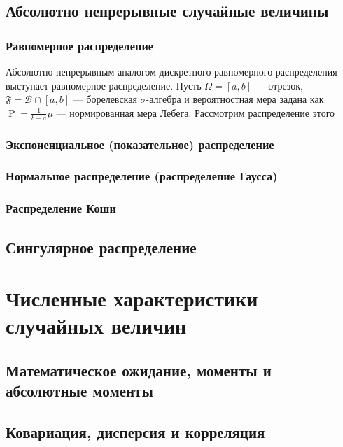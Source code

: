 \documentclass[12pt]{article}
\numberwithin{theorem}{section}
\theoremstyle{definition}
\newcommand{\calB}{\mathcal{B}}
\newcommand{\prob}{\operatorname{P}}
\newcommand{\events}{\mathfrak{F}}
\begin{document}
	\subsection{Абсолютно непрерывные случайные величины}
	
	\subsubsection{Равномерное распределение}
	
	Абсолютно непрерывным аналогом дискретного равномерного распределения выступает равномерное распределение.
	Пусть $ \Omega = [a,b] $ --- отрезок, $ \events = \calB \cap [a,b] $ --- борелевская $ \sigma $-алгебра
	и вероятностная мера задана как $ \prob = \tfrac{1}{b - a}\mu $ --- нормированная мера Лебега.
	Рассмотрим распределение этого 
	
	\subsubsection{Экспоненциальное (показательное) распределение}
	
	\subsubsection{Нормальное распределение (распределение Гаусса)}
	
	\subsubsection{Распределение Коши}
	
	\subsection{Сингулярное распределение}
	
	\section{Численные характеристики случайных величин}
	
	\subsection{Математическое ожидание, моменты и абсолютные моменты}
	
	\subsection{Ковариация, дисперсия и корреляция}
	
\end{document}

